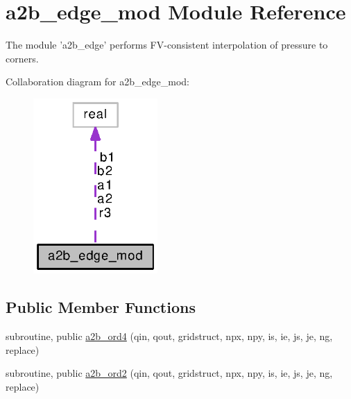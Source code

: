 \section{a2b\-\_\-edge\-\_\-mod Module Reference}
\label{classa2b__edge__mod}


The module 'a2b\-\_\-edge' performs F\-V-\/consistent interpolation of pressure to corners.  




Collaboration diagram for a2b\-\_\-edge\-\_\-mod\-:
\nopagebreak
\begin{figure}[H]
\begin{center}
\leavevmode
\includegraphics[width=134pt]{classa2b__edge__mod__coll__graph}
\end{center}
\end{figure}
\subsection*{Public Member Functions}
\begin{DoxyCompactItemize}
\item 
subroutine, public \hyperlink{classa2b__edge__mod_a1aa7bae49fd010f65a8018e76a46d1cd}{a2b\-\_\-ord4} (qin, qout, gridstruct, npx, npy, is, ie, js, je, ng, replace)
\item 
subroutine, public \hyperlink{classa2b__edge__mod_a43e19bd75d30458df0e1dd77845620eb}{a2b\-\_\-ord2} (qin, qout, gridstruct, npx, npy, is, ie, js, je, ng, replace)
\end{DoxyCompactItemize}
